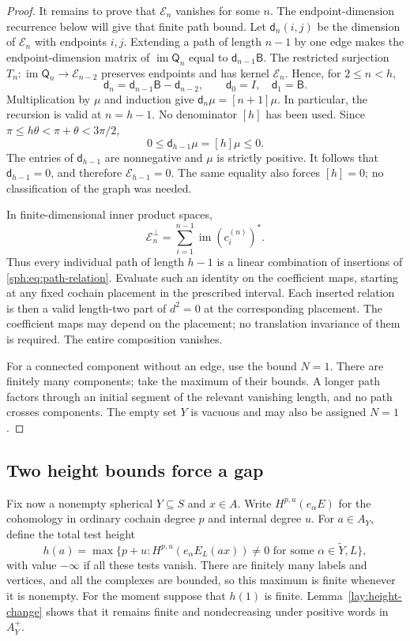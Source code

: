 \begin{proof}
It remains to prove that $\mathcal E_n$ vanishes for some $n$.
The endpoint-dimension recurrence below will give that finite path bound.
Let \(\mathsf d_n(i,j)\) be the dimension of
\(\mathcal E_n\) with endpoints \(i,j\).
Extending a path of length \(n-1\) by one edge makes the
endpoint-dimension matrix of
\(\operatorname{im}\mathsf Q_n\) equal to
\(\mathsf d_{n-1}\mathsf B\).
The restricted surjection
\(T_n:\operatorname{im}\mathsf Q_n\to\mathcal E_{n-2}\)
preserves endpoints and has kernel \(\mathcal E_n\).
Hence, for \(2\leq n<h\),
\[
 \mathsf d_n=\mathsf d_{n-1}\mathsf B-\mathsf d_{n-2},
 \qquad \mathsf d_0=I,\quad\mathsf d_1=\mathsf B.
\]
Multiplication by \(\mu\) and induction give
\(\mathsf d_n\mu=[n+1]\mu\).
In particular, the recursion is valid at \(n=h-1\).
No denominator \([h]\) has been used.
Since \(\pi\leq h\theta<\pi+\theta<3\pi/2\),
\[
 0\leq\mathsf d_{h-1}\mu=[h]\mu\leq0.
\]
The entries of \(\mathsf d_{h-1}\) are nonnegative and
\(\mu\) is strictly positive.  It follows that
\(\mathsf d_{h-1}=0\), and therefore
\(\mathcal E_{h-1}=0\).  The same equality also forces
\([h]=0\); no classification of the graph was needed.

In finite-dimensional inner product spaces,
\[
 \mathcal E_n^\perp
       =\sum_{i=1}^{n-1}\operatorname{im}(c_i^{(n)})^*.
\]
Thus every individual path of length \(h-1\) is a linear
combination of insertions of
\eqref{sph:eq:path-relation}.  Evaluate such an identity
on the coefficient maps, starting at any fixed cochain
placement in the prescribed interval.  Each inserted
relation is then a valid length-two part of \(d^2=0\)
at the corresponding placement.  The coefficient maps
may depend on the placement; no translation invariance
of them is required.  The entire composition vanishes.

For a connected component without an edge, use the bound
\(N=1\).  There are finitely many components; take the
maximum of their bounds.  A longer path factors through
an initial segment of the relevant vanishing length,
and no path crosses components.  The empty set \(Y\)
is vacuous and may also be assigned \(N=1\).
\end{proof}

\subsection{Two height bounds force a gap}

Fix now a nonempty spherical \(Y\subseteq S\) and \(x\in A\).
Write \(H^{p,u}(e_\alpha E)\) for the cohomology in ordinary
cochain degree \(p\) and internal degree \(u\).
For \(a\in A_Y\), define the total test height
\begin{equation}\label{sph:eq:height}
 h(a)=\max\{p+u:H^{p,u}(e_\alpha E_L(ax))\ne0
                  \text{ for some }\alpha\in\widetilde Y,L\},
\end{equation}
with value \(-\infty\) if all these tests vanish.
There are finitely many labels and vertices, and all the
complexes are bounded, so this maximum is finite whenever
it is nonempty.
For the moment suppose that \(h(1)\) is finite.
Lemma~\ref{lay:height-change} shows that it remains finite
and nondecreasing under positive words in \(A_Y^+\).

